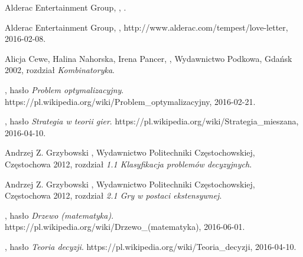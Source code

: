 \documentclass[11pt]{aghdpl}
\author{Damian Malarczyk}
\date{2015}
\begin{document}
\titlepages
\setcounter{tocdepth}{3}
\tableofcontents
\clearpage










\begin{thebibliography}{1}

\bibitem{}
\label{bib:loveLetterGame}
Alderac Entertainment Group,
,
.

\bibitem{}
\label{bib:loveLetterWebsite}
Alderac Entertainment Group,
,
\newblock http://www.alderac.com/tempest/love-letter, 2016-02-08.

\bibitem{}
\label{bib:tabliceMatematyczne}
Alicja Cewe, Halina Nahorska, Irena Pancer,
,
\newblock Wydawnictwo Podkowa, Gdańsk 2002,
\newblock rozdział {\em Kombinatoryka}.

\bibitem{}
\label{bib:wiki_ProblemOptymalizacyjny}
, hasło {\em Problem optymalizacyjny}.
\newblock https://pl.wikipedia.org/wiki/Problem\_optymalizacyjny, 2016-02-21.

\bibitem{}
\label{bib:wiki_StrategiaTeoriaGier}
, hasło {\em Strategia w teorii gier}.
\newblock https://pl.wikipedia.org/wiki/Strategia\_mieszana, 2016-04-10.

\bibitem{}
\label{bib:matematyczneModeleKonfliktu_klasyfikacja}
Andrzej Z. Grzybowski
,
\newblock Wydawnictwo Politechniki Częstochowskiej, Częstochowa 2012,
\newblock rozdział {\em 1.1 Klasyfikacja problemów decyzyjnych}.

\bibitem{}
\label{bib:matematyczneModeleKonfliktu_graEkstensywna}
Andrzej Z. Grzybowski
,
\newblock Wydawnictwo Politechniki Częstochowskiej, Częstochowa 2012,
\newblock rozdział {\em 2.1 Gry w postaci ekstensywnej}.

\bibitem{}
\label{bib:wiki_drzewo}
, hasło {\em Drzewo (matematyka)}.
\newblock https://pl.wikipedia.org/wiki/Drzewo\_(matematyka), 2016-06-01.

\bibitem{}
\label{bib:wiki_TeoriaDecyzji}
, hasło {\em Teoria decyzji}.
\newblock https://pl.wikipedia.org/wiki/Teoria\_decyzji, 2016-04-10.


\end{thebibliography}
\end{document}
